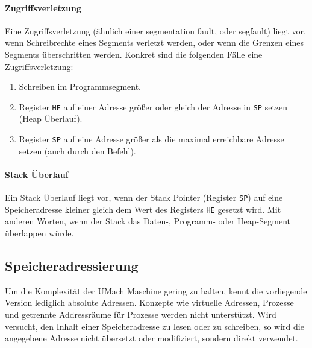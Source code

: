 \paragraph{Zugriffsverletzung}

Eine Zugriffsverletzung (ähnlich einer \glqq segmentation fault\grqq, oder
\glqq segfault\grqq)  liegt vor, wenn Schreibrechte
eines Segments verletzt werden, oder wenn die Grenzen eines Segments
überschritten werden. Konkret sind die folgenden Fälle eine Zugriffsverletzung:
\begin{enumerate}
 \item Schreiben im Programmsegment.
 \item Register \texttt{HE} auf einer Adresse größer oder gleich der Adresse in
       \texttt{SP} setzen (Heap Überlauf).
 \item Register \texttt{SP} auf eine Adresse größer als die maximal erreichbare
       Adresse setzen (auch durch den  Befehl).
\end{enumerate}



\paragraph{Stack Überlauf}
Ein Stack Überlauf liegt vor, wenn der Stack Pointer (Register \texttt{SP})
 auf eine Speicheradresse kleiner gleich dem Wert des
Registers \texttt{HE} gesetzt wird. Mit anderen Worten, wenn der Stack das
Daten-, Programm- oder Heap-Segment überlappen würde.


\subsection{Speicheradressierung}

Um die Komplexität der UMach Maschine gering zu halten, kennt die vorliegende
Version lediglich absolute Adressen. Konzepte wie virtuelle Adressen,
Prozesse und getrennte Addressräume für Prozesse werden nicht
unterstützt. Wird versucht, den Inhalt einer Speicheradresse zu lesen oder zu
schreiben, so wird die angegebene Adresse nicht übersetzt oder modifiziert,
sondern direkt verwendet.


